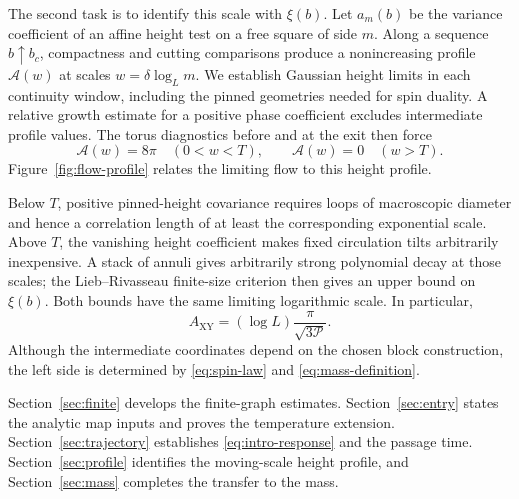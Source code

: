 The second task is to identify this scale with $\xi(b)$. Let $a_m(b)$ be the variance coefficient of an affine height test on a free square of side $m$. Along a sequence $b\uparrow b_c$, compactness and cutting comparisons produce a nonincreasing profile $\mathcal A(w)$ at scales $w=\delta\log_L m$. We establish Gaussian height limits in each continuity window, including the pinned geometries needed for spin duality. A relative growth estimate for a positive phase coefficient excludes intermediate profile values. The torus diagnostics before and at the exit then force
\begin{equation}\label{eq:intro-profile}
 \mathcal A(w)=8\pi\quad(0<w<T),\qquad
 \mathcal A(w)=0\quad(w>T).
\end{equation}
Figure~\ref{fig:flow-profile} relates the limiting flow to this height profile.

Below $T$, positive pinned-height covariance requires loops of macroscopic diameter and hence a correlation length of at least the corresponding exponential scale. Above $T$, the vanishing height coefficient makes fixed circulation tilts arbitrarily inexpensive. A stack of annuli gives arbitrarily strong polynomial decay at those scales; the Lieb--Rivasseau finite-size criterion then gives an upper bound on $\xi(b)$. Both bounds have the same limiting logarithmic scale. In particular,
\begin{equation}\label{eq:amplitude}
 A_{\mathrm{XY}}=(\log L)\frac{\pi}{\sqrt{3\mathcal P}}.
\end{equation}
Although the intermediate coordinates depend on the chosen block construction, the left side is determined by \eqref{eq:spin-law} and \eqref{eq:mass-definition}.

Section~\ref{sec:finite} develops the finite-graph estimates. Section~\ref{sec:entry} states the analytic map inputs and proves the temperature extension. Section~\ref{sec:trajectory} establishes \eqref{eq:intro-response} and the passage time. Section~\ref{sec:profile} identifies the moving-scale height profile, and Section~\ref{sec:mass} completes the transfer to the mass.

